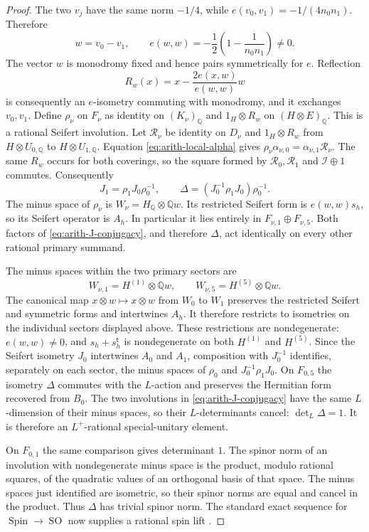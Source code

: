 \begin{proof}
The two $v_j$ have the same norm $-1/4$, while
$e(v_0,v_1)=-1/(4n_0n_1)$.  Therefore
\[
 w=v_0-v_1,\qquad
 e(w,w)=-\frac12\left(1-\frac1{n_0n_1}\right)\ne0.
\]
The vector $w$ is monodromy fixed and hence pairs symmetrically
for $e$.  Reflection
\[
 R_w(x)=x-\frac{2e(x,w)}{e(w,w)}w
\]
is consequently an $e$-isometry commuting with monodromy, and it
exchanges $v_0,v_1$.  Define $\rho_\nu$ on $F_\nu$ as identity on
$(K_\nu)_{\mathbb Q}$ and $1_H\otimes R_w$ on
$(H\otimes E)_{\mathbb Q}$.  This is a rational Seifert
involution.  Let $\mathcal R_\nu$ be identity on $D_\nu$ and
$1_H\otimes R_w$ from $H\otimes U_{0,\mathbb Q}$ to
$H\otimes U_{1,\mathbb Q}$.  Equation
\eqref{eq:arith-local-alpha} gives
$\rho_\nu\alpha_{\nu,0}=\alpha_{\nu,1}\mathcal R_\nu$.
The same $R_w$ occurs for both coverings, so the square formed by
$\mathcal R_0,\mathcal R_1$ and $\mathcal I\oplus1$ commutes.  Consequently
\begin{equation}\label{eq:arith-J-conjugacy}
 J_1=\rho_1J_0\rho_0^{-1},\qquad
 \Delta=(J_0^{-1}\rho_1J_0)\rho_0^{-1}.
\end{equation}
The minus space of $\rho_\nu$ is
$W_\nu=H_{\mathbb Q}\otimes\mathbb Qw$. Its restricted Seifert form
is $e(w,w)s_h$, so its Seifert operator is $A_h$. In particular it
lies entirely in $F_{\nu,1}\oplus F_{\nu,5}$. Both factors of
\eqref{eq:arith-J-conjugacy}, and therefore $\Delta$, act
identically on every other rational primary summand.

The minus spaces within the two primary sectors are
\[
 W_{\nu,1}=H^{(1)}\otimes\mathbb Qw,\qquad
 W_{\nu,5}=H^{(5)}\otimes\mathbb Qw.
\]
The canonical map $x\otimes w\mapsto x\otimes w$ from $W_0$ to
$W_1$ preserves the restricted Seifert and symmetric forms and
intertwines $A_h$. It therefore restricts to isometries on the
individual sectors displayed above. These restrictions are
nondegenerate: $e(w,w)\ne0$, and $s_h+s_h^{\mathsf t}$ is
nondegenerate on both $H^{(1)}$ and $H^{(5)}$. Since the Seifert
isometry $J_0$ intertwines $A_0$ and $A_1$, composition with
$J_0^{-1}$ identifies, separately on each sector, the minus spaces
of $\rho_0$ and $J_0^{-1}\rho_1J_0$.
On $F_{0,5}$ the isometry $\Delta$ commutes with the $L$-action
and preserves the Hermitian form recovered from $B_0$.  The two
involutions in \eqref{eq:arith-J-conjugacy} have the same
$L$-dimension of their minus spaces, so their $L$-determinants
cancel: $\det_L\Delta=1$.
It is therefore an $L^+$-rational special-unitary element.

On $F_{0,1}$ the same comparison gives determinant $1$.  The
spinor norm of an involution with nondegenerate minus space is the
product, modulo rational squares, of the quadratic values of an
orthogonal basis of that space.  The minus spaces just identified
are isometric, so their spinor norms are
equal and cancel in the product.  Thus $\Delta$ has trivial
spinor norm.  The standard exact sequence for
$\operatorname{Spin}\to\operatorname{SO}$ now supplies a rational
spin lift
\cite[Section~C.5, paragraph before Example~C.5.5 and Lemma~C.5.8]{Conrad2014Reductive}.
\end{proof}

